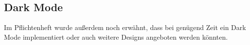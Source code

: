 \documentclass[]{article}
\begin{document}
		\subsection{Dark Mode}
			Im Pflichtenheft wurde außerdem noch erwähnt, dass bei genügend Zeit ein Dark Mode implementiert oder auch weitere Designs angeboten werden könnten. 	
		
		
\newpage
\printbibliography
\end{document}
